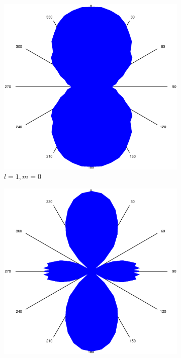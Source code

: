 		\begin{figure}[!ht]
			\begin{subfigure}{0.3\textwidth}
				\centering
				\includegraphics[width=\textwidth]{images/tv2b-180deg-peak1-angle.eps}
				\caption{$l = 1, m=0$}
				\label{fig:tv2b-1}
			\end{subfigure}
			\begin{subfigure}{0.3\textwidth}
				\centering
				\includegraphics[width=\textwidth]{images/tv2b-180deg-peak2-angle.eps}

\end{subfigure}
\end{figure}
